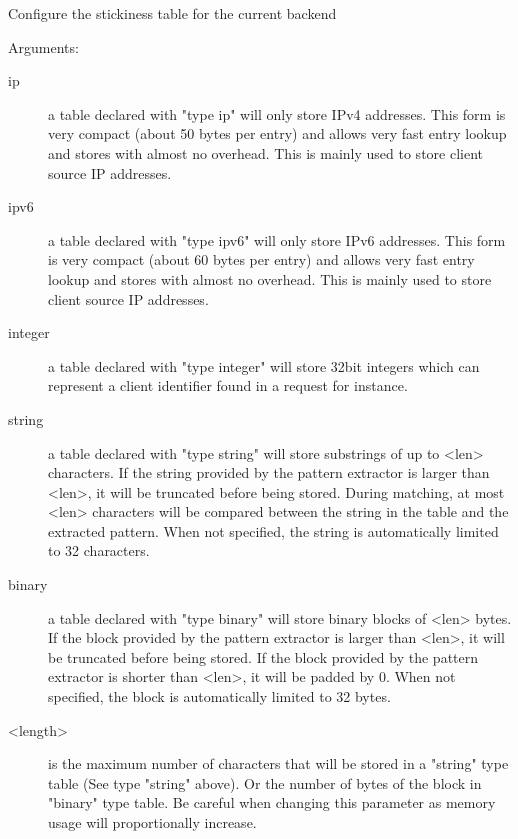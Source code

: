 {  Configure the stickiness table for the current backend


  Arguments:
  \begin{description}
  \item[ip] a table declared with "type ip" will only store IPv4 addresses.
               This form is very compact (about 50 bytes per entry) and allows
               very fast entry lookup and stores with almost no overhead. This
               is mainly used to store client source IP addresses.

  \item[ipv6] a table declared with "type ipv6" will only store IPv6 addresses.
               This form is very compact (about 60 bytes per entry) and allows
               very fast entry lookup and stores with almost no overhead. This
               is mainly used to store client source IP addresses.

  \item[integer] a table declared with "type integer" will store 32bit integers
               which can represent a client identifier found in a request for
               instance.

  \item[string] a table declared with "type string" will store substrings of up
               to <len> characters. If the string provided by the pattern
               extractor is larger than <len>, it will be truncated before
               being stored. During matching, at most <len> characters will be
               compared between the string in the table and the extracted
               pattern. When not specified, the string is automatically limited
               to 32 characters.

  \item[binary] a table declared with "type binary" will store binary blocks
               of <len> bytes. If the block provided by the pattern
               extractor is larger than <len>, it will be truncated before
               being stored. If the block provided by the pattern extractor
               is shorter than <len>, it will be padded by 0. When not
               specified, the block is automatically limited to 32 bytes.

  \item[<length>] is the maximum number of characters that will be stored in a
               "string" type table (See type "string" above). Or the number
               of bytes of the block in "binary" type table. Be careful when
               changing this parameter as memory usage will proportionally
               increase.


\end{description}}
